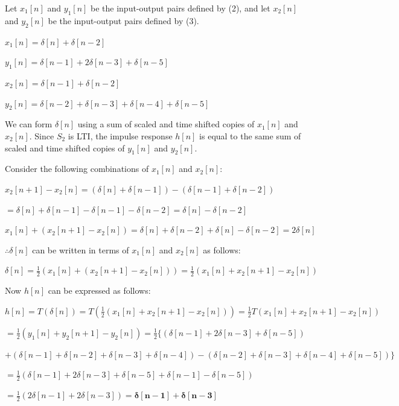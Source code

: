 \documentclass[fleqn]{article}
\begin{document}
\begin{enumerate}[nolistsep]
\begin{enumerate}
				Let $x_1[n]$ and $y_1[n]$ be the input-output pairs defined by (2), and let $x_2[n]$ and $y_2[n]$ be the input-output pairs defined by (3).
				
			$x_1[n] = \delta[n] + \delta[n-2]$
			
			$y_1[n] = \delta[n-1] + 2\delta[n-3] + \delta[n-5]$
			
			$x_2[n] = \delta[n-1] + \delta[n-2]$
			
			$y_2[n] = \delta[n-2] + \delta[n-3] + \delta[n-4] + \delta[n-5]$
			
			We can form $\delta[n]$ using a sum of scaled and time shifted copies of $x_1[n]$ and $x_2[n]$. Since $S_2$ is LTI, the impulse response $h[n]$ is equal to the same sum of scaled and time shifted copies of $y_1[n]$ and $y_2[n]$.
			
			Consider the following combinations of $x_1[n]$ and $x_2[n]$:
			
			$x_2[n+1] - x_2[n]= (\delta[n] + \delta[n-1]) - (\delta[n-1] + \delta[n-2])$
			
			$ = \delta[n] + \delta[n-1] - \delta[n-1] - \delta[n-2] = \delta[n] - \delta[n-2]$
			
			$x_1[n] + (x_2[n+1] - x_2[n]) = \delta[n] + \delta[n-2] + \delta[n] - \delta[n-2] = 2\delta[n]$
			
			$\therefore \delta[n]$ can be written in terms of $x_1[n]$ and $x_2[n]$ as follows:
			
			$\delta[n] = \frac{1}{2}(x_1[n] + (x_2[n+1] - x_2[n])) = \frac{1}{2}(x_1[n] + x_2[n+1] - x_2[n])$
			
			Now $h[n]$ can be expressed as follows: 
			
			$h[n] = T(\delta[n]) = T(\frac{1}{2}(x_1[n] + x_2[n+1] - x_2[n])) = \frac{1}{2}T(x_1[n] + x_2[n+1] - x_2[n])$
			
			$ = \frac{1}{2}(y_1[n] + y_2[n+1] - y_2[n]) = \frac{1}{2}\{(\delta[n-1] + 2\delta[n-3] + \delta[n-5])$
			
			$ + (\delta[n-1] + \delta[n-2] + \delta[n-3] + \delta[n-4]) - (\delta[n-2] + \delta[n-3] + \delta[n-4] + \delta[n-5])\}$
			
			$ = \frac{1}{2}(\delta[n-1] + 2\delta[n-3] + \delta[n-5] + \delta[n-1] - \delta[n-5])$
			
			$ = \frac{1}{2}(2\delta[n-1] + 2\delta[n-3]) = \mathbf{\delta[n-1] + \delta[n-3]}$
			\end{enumerate}
		
	\end{enumerate}
\end{document}
